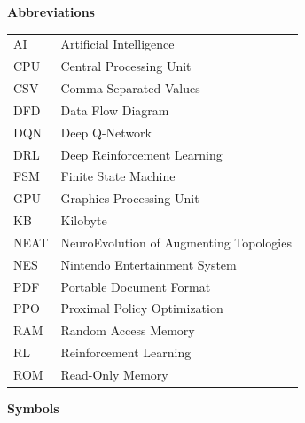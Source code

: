 
\noindent\textbf{Abbreviations}
\vspace{0.2cm}

\begin{longtable}{@{}p{}p{}@{}}
AI    & Artificial Intelligence \\
CPU   & Central Processing Unit \\
CSV   & Comma-Separated Values \\
DFD   & Data Flow Diagram \\
DQN   & Deep Q-Network \\
DRL   & Deep Reinforcement Learning \\
FSM   & Finite State Machine \\
GPU   & Graphics Processing Unit \\
KB    & Kilobyte \\
NEAT  & NeuroEvolution of Augmenting Topologies \\
NES   & Nintendo Entertainment System \\
PDF   & Portable Document Format \\
PPO   & Proximal Policy Optimization \\
RAM   & Random Access Memory \\
RL    & Reinforcement Learning \\
ROM   & Read-Only Memory \\
\end{longtable}

\vspace{0.5cm}

\noindent\textbf{Symbols}
\vspace{0.2cm}

